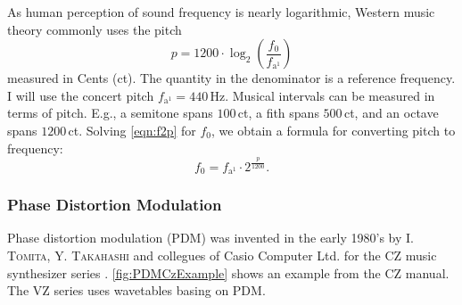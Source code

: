\documentclass[a4paper]{article}
\newcommand\person[1]{\textsc{#1}}
\begin{document}
As human perception of sound frequency is nearly logarithmic, Western music
theory commonly uses the pitch
\begin{equation}
  \label{eqn:f2p}
  p = 1200\cdot\log_2\!\left(\dfrac{f_0}{f_{\text{a}^1}}\right)
\end{equation}
measured in Cents (ct). The quantity in the denominator is a reference
frequency. I will use the concert pitch $f_{\text{a}^1}=440\,$Hz. Musical
intervals can be measured in terms of pitch. E.g., a semitone spans $100$\,ct, a
fith spans $500$\,ct, and an octave spans $1200$\,ct. Solving \cref{eqn:f2p}
for $f_0$, we obtain a formula for converting pitch to frequency:
\begin{equation}
  \label{eqn:p2f}
  f_0 = f_{\text{a}^1}\cdot 2^{\frac{p}{1200}}.
\end{equation}

\subsubsection{Phase Distortion Modulation}
\newcommand\PDMcharact[3]{{%
  \begin{scope}[shift={(#1,#2)}]
    \def\aI{#3}
    \def\xxI{1/(2*\aI)}
    \draw[thick,domain=0:\xxI,variable=\x] plot ({\x},{\a*\x});
    \draw[thick,domain=\xxI:1,variable=\x] plot ({\x},{(\a*\x+\a-1)/(2*\a-1)});
  \end{scope}
}}
\newcommand\PDMsine[3]{{%
  \begin{scope}[shift={(#1,#2)}]
    \def\aI{#3}
    \def\xxI{1/(2*\aI)}
    \draw[very thin,dashed,domain=0:1,variable=\x] plot ({\x},{0.5*sin(360*\x-90)});
    \draw[thick,domain=0:\xxI,variable=\x] plot ({\x},{0.5*sin(360*\a*\x-90)});
    \draw[thick,domain=\xxI:1,variable=\x] plot ({\x},{0.5*sin(360*((\a*\x+\a-1)/(2*\a-1))-90)});
  \end{scope}
}}
Phase distortion modulation (PDM) was invented in the early 1980's by \person{I.
Tomita}, \person{Y. Takahashi} and collegues of Casio Computer Ltd. for the CZ
music synthesizer series \cite{Ger09}. \cref{fig:PDMCzExample} shows an example
from the CZ manual. The VZ series uses wavetables basing on PDM.
\end{document}
